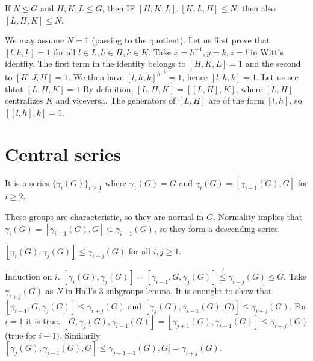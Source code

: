 \documentclass[twoside, 11pt]{article}
\begin{document}
\begin{teorema}
If $N\trianglelefteq G$ and $H,K,L\leq G$, then IF $[H,K,L],[K,L,H]\leq N$, then also $[L,H,K]\leq N$. 
\end{teorema}
\begin{dem}
We may assume $N=1$ (passing to the quotient). Let us first prove that $[l,h,k]=1$ for all $l\in L, h\in H, k\in K$. Take $x=h^{-1}, y=k,z=l$ in Witt's identity. The first term in the identity belongs to $[H,K,L]=1$ and the second to $[K,J,H]=1$. We then have $[l,h,k]^{h^{-1}}=1$, hence $[l,h,k]=1$. Let us see thtat $[L,H,K]=1$ By definition, $[L,H,K]=[[L,H],K]$, where $[L,H]$ centralizes $K$ and viceversa. The generators of $[L,H]$ are of the form $[l,h]$, so $[[l,h],k]=1$. 
\end{dem}

\section{Central series}
\begin{defi}
It is a series $\{\gamma_i(G)\}_{i\geq 1}$ where $\gamma_1(G)=G$ and $\gamma_i(G)=[\gamma_{i-1}(G),G]$ for $i\geq 2$. 
\end{defi}
These groups are characteristic, so they are normal in $G$. Normality implies that $\gamma_i(G)=[\gamma_{i-1}(G),G]\subseteq\gamma_{i-1}(G)$, so they form a descending series. 

\begin{teorema}
$[\gamma_i(G),\gamma_j(G)]\leq \gamma_{i+j}(G)$ for all $i,j\geq 1$. 
\end{teorema}
\begin{dem}
Induction on $i$. $[\gamma_i(G),\gamma_j(G)]=[\gamma_{i-1}, G, \gamma_j(G)]\overset{?}{\leq} \gamma_{i+j}(G)\trianglelefteq G$. Take $\gamma_{i+j}(G)$ as $N$ in Hall's 3 subgroups lemma. It is enought to show that $[\gamma_{i-1}, G, \gamma_j(G)]\leq \gamma_{i+j}(G)$ and $ [\gamma_j(G),\gamma_{i-1}(G),G)]\leq\gamma_{i+j}(G)$. For $i=1$ it is true. $[G,\gamma_j(G),\gamma_{i-1}(G)]=[\gamma_{j+1}(G),\gamma_{i-1}(G)]\leq \gamma_{i+j}(G)$ (true for $i-1)$. Similarily $[\gamma_j(G),\gamma_{i-1}(G),G]\leq \gamma_{j+1-1}(G),G]=\gamma_{i+j}(G)$.  
\end{dem}
\end{document}
